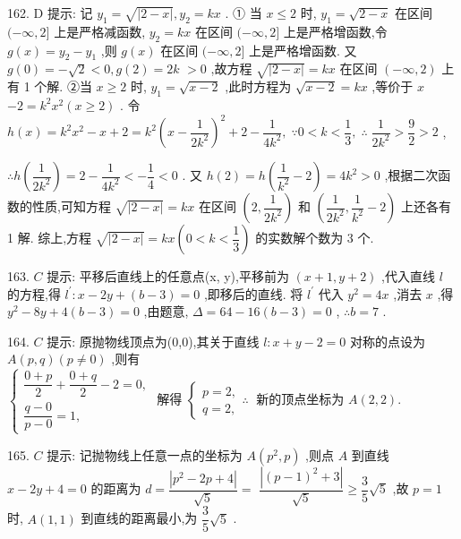 162. D 提示: 记 ${y}_{1} = \sqrt{\left| 2 - x\right| },{y}_{2} = {kx}$ . ① 当 $x \leq  2$ 时, ${y}_{1} = \sqrt{2 - x}$ 在区间 $( - \infty ,2\rbrack$ 上是严格减函数, ${y}_{2} = {kx}$ 在区间 $( - \infty ,2\rbrack$ 上是严格增函数,令 $g\left( x\right)  = {y}_{2} - {y}_{1}$ ,则 $g\left( x\right)$ 在区间 $( - \infty ,2\rbrack$ 上是严格增函数. 又 $g\left( 0\right)  =  - \sqrt{2} < 0,g\left( 2\right)  = {2k}$  $> 0$ ,故方程 $\sqrt{\left| 2 - x\right| } = {kx}$ 在区间 $\left( {-\infty ,2}\right)$ 上有 1 个解. ②当 $x \geq  2$ 时, ${y}_{1} = \sqrt{x - 2}$ ,此时方程为 $\sqrt{x - 2} = {kx}$ ,等价于 $x$  $- 2 = {k}^{2}{x}^{2}\left( {x \geq  2}\right)$ . 令 $h\left( x\right)  = {k}^{2}{x}^{2} - x + 2 = {k}^{2}{\left( x - \dfrac{1}{2{k}^{2}}\right) }^{2} + 2 - \dfrac{1}{4{k}^{2}},\;\because 0 < k < \dfrac{1}{3},\;\therefore \;\dfrac{1}{2{k}^{2}} > \dfrac{9}{2} > 2$ ,

$\therefore h\left( \dfrac{1}{2{k}^{2}}\right)  = 2 - \dfrac{1}{4{k}^{2}} <  - \dfrac{1}{4} < 0$ . 又 $h\left( 2\right)  = h\left( {\dfrac{1}{{k}^{2}} - 2}\right)  = 4{k}^{2} > 0$ ,根据二次函数的性质,可知方程 $\sqrt{\left| 2 - x\right| } = {kx}$ 在区间 $\left( {2,\dfrac{1}{2{k}^{2}}}\right)$ 和 $\left( {\dfrac{1}{2{k}^{2}},\dfrac{1}{{k}^{2}} - 2}\right)$ 上还各有 1 解. 综上,方程 $\sqrt{\left| 2 - x\right| } = {kx}\left( {0 < k < \dfrac{1}{3}}\right)$ 的实数解个数为 3 个.

163. $C$ 提示: 平移后直线上的任意点(x, y),平移前为 $\left( {x + 1,y + 2}\right)$ ,代入直线 $l$ 的方程,得 ${l}^{\prime } : x - {2y} + \left( {b - 3}\right)  = 0$ ,即移后的直线. 将 ${l}^{\prime }$ 代入 ${y}^{2} = {4x}$ ,消去 $x$ ,得 ${y}^{2} - {8y} + 4\left( {b - 3}\right)  = 0$ ,由题意, $\Delta  = {64} - {16}\left( {b - 3}\right)  = 0$ , $\therefore b = 7$ .

164. $C$ 提示: 原抛物线顶点为(0,0),其关于直线 $l : x + y - 2 = 0$ 对称的点设为 $A\left( {p,q}\right) \left( {p \neq  0}\right)$ ,则有 $\left\{  {\begin{array}{l} \dfrac{0 + p}{2} + \dfrac{0 + q}{2} - 2 = 0, \\  \dfrac{q - 0}{p - 0} = 1, \end{array}\text{ 解得 }\left\{  {\begin{array}{l} p = 2, \\  q = 2, \end{array}\therefore \;\text{ 新的顶点坐标为 }A\left( {2,2}\right) .}\right. }\right.$

165. $C$ 提示: 记抛物线上任意一点的坐标为 $A\left( {{p}^{2},p}\right)$ ,则点 $A$ 到直线 $x - {2y} + 4 = 0$ 的距离为 $d = \dfrac{\left| {p}^{2} - 2p + 4\right| }{\sqrt{5}} =$  $\dfrac{\left| {\left( p - 1\right) }^{2} + 3\right| }{\sqrt{5}} \geq  \dfrac{3}{5}\sqrt{5}$ ,故 $p = 1$ 时, $A\left( {1,1}\right)$ 到直线的距离最小,为 $\dfrac{3}{5}\sqrt{5}$ .

